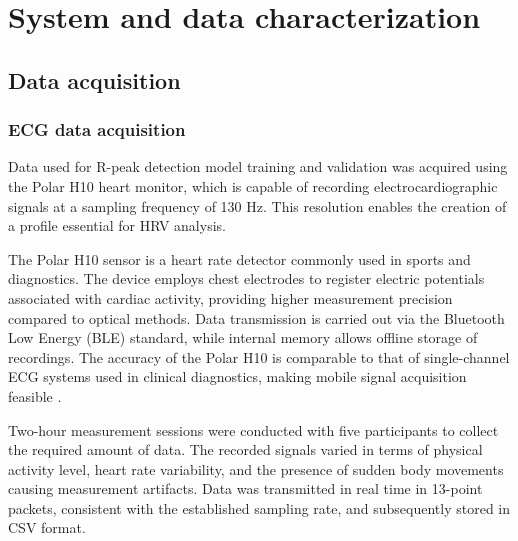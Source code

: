 \documentclass[journal]{IEEEtran}
\begin{document}
\section{System and data characterization}
\subsection{Data acquisition}
\subsubsection{ECG data acquisition}
Data used for R-peak detection model training and validation was acquired using the Polar H10 heart monitor, which is capable of recording electrocardiographic signals at a sampling frequency of 130 Hz. This resolution enables the creation of a profile essential for HRV analysis.

The Polar H10 sensor is a heart rate detector commonly used in sports and diagnostics. The device employs chest electrodes to register electric potentials associated with cardiac activity, providing higher measurement precision compared to optical methods. Data transmission is carried out via the Bluetooth Low Energy (BLE) standard, while internal memory allows offline storage of recordings. The accuracy of the Polar H10 is comparable to that of single-channel ECG systems used in clinical diagnostics, making mobile signal acquisition feasible \cite{21}.

Two-hour measurement sessions were conducted with five participants to collect the required amount of data. The recorded signals varied in terms of physical activity level, heart rate variability, and the presence of sudden body movements causing measurement artifacts. Data was transmitted in real time in 13-point packets, consistent with the established sampling rate, and subsequently stored in CSV format.
\end{document}
